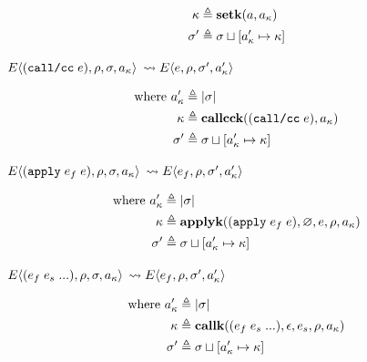 \documentclass[12pt,draft]{article}
\newcommand{\applysyn}[2]{(\texttt{apply}\;#1\;#2)}
\newcommand{\callccsyn}[1]{(\texttt{call/cc}\;#1)}
\newcommand{\E}[4]{E\langle #1 , #2 , #3 , #4 \rangle}
\begin{document}
\begin{multicols*}{2}
\begin{align*}
    \kappa &\triangleq \textbf{setk}(a , a_{\kappa}) \\
    \sigma' &\triangleq \sigma \sqcup [a_{\kappa}' \mapsto \kappa]
  \end{align*}
  \begin{center}
    $\E{\callccsyn{e}}{\cenv}{\cstore}{\ckaddr}$
    $\leadsto \E{e}{\cenv}{\cstore'}{\ckaddr'}$
  \end{center}
  \vspace{-7mm}
  \begin{align*}
    \text{where }
    \ckaddr' &\triangleq |\cstore| \\
    \ckont &\triangleq \textbf{callcck}(\callccsyn{e} , \ckaddr) \\
    \cstore' &\triangleq \cstore \sqcup [\ckaddr' \mapsto \ckont]
  \end{align*}
  \vfill\null
  \columnbreak
  \begin{center}
    $\E{\applysyn{e_f}{e}}{\cenv}{\cstore}{\ckaddr}$
    $\leadsto \E{e_f}{\cenv}{\cstore'}{\ckaddr'}$
  \end{center}
  \vspace{-7mm}
  \begin{align*}
    \text{where }
    \ckaddr' &\triangleq |\cstore| \\
    \ckont &\triangleq \textbf{applyk}(\applysyn{e_f}{e} , \varnothing ,
             e , \cenv , \ckaddr) \\
    \cstore' &\triangleq \cstore \sqcup [\ckaddr' \mapsto \ckont]
  \end{align*}
  \begin{center}
    $\E{(e_f \; e_s \; ...)}{\cenv}{\cstore}{\ckaddr}$
    $\leadsto \E{e_f}{\cenv}{\cstore'}{\ckaddr'}$
  \end{center}
  \vspace{-7mm}
  \begin{align*}
    \text{where }
    a_{\kappa}' &\triangleq |\sigma| \\
    \kappa &\triangleq \textbf{callk}((e_f \; e_s \; ...) , \epsilon
             , e_s , \rho , a_{\kappa}) \\
    \sigma' &\triangleq \sigma \sqcup [a_{\kappa}' \mapsto \kappa]
  \end{align*}
  \begin{center}
  \end{center}
  \vspace{-7mm}
  \begin{align*}
  \end{align*}
\end{multicols*}
\end{document}
